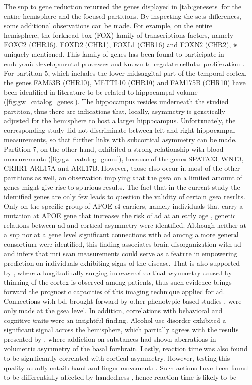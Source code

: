 The \ac{snp} to gene reduction returned the genes displayed in \autoref{tab:genesets} for the entire hemisphere and the focused partitions. By inspecting the sets differences, some additional observations can be made. For example, on the entire hemisphere, the forkhead box (FOX) family of transcriptions factors, namely   FOXC2 (CHR16), FOXD2 (CHR1), FOXL1 (CHR16) and FOXN2 (CHR2), is uniquely mentioned. This family of genes has been found to participate in embryonic developmental processes and known to regulate cellular proliferation \cite{Jackson2010}. For partition 5, which includes the lower midsaggital part of the temporal cortex, the genes FAM53B (CHR10), METTL10 (CHR10) and FAM175B (CHR10) have been identified in literature to be related to hippocampal volume \cite{VanderMeer2020} (\autoref{fig:gw_catalog_genes}). The hippocampus resides underneath the studied partition, thus there are indications that, locally, asymmetry is genetically adjusted for the hemisphere to host a larger hippocampus. Unfortunately, the corresponding study did not discriminate between left and right hippocampal measurements, so that further links with subcortical asymmetry can be made. Partition 7, on the other hand, exhibited a strong relationship with blood measurements (\autoref{fig:gw_catalog_genes}), because of the genes SPATA33, WNT3, CRHR1 ARL17A and ARL17B. However, those also occur in most of the other partitions as well, an observation implying that the \ac{gsea} on a limited amount of genes might give rise to spurious results. The fact that in the current study the identified genes are only few leads to question the validity of certain \ac{gsea} results. Only on the specific group of APOE $\epsilon$4-carriers, namely individuals that carry a mutation at APOE gene that increases the risk of \ac{ad} at an early age \cite{Michaelson2014},  genetic relations between \ac{ad} and cortical asymmetry were identified. Although neither at a \ac{snp} nor at a gene level significant connections with \ac{ad} among a more general consortium were identified, this finding associates brain disorganization with \ac{ad} and infers that \ac{mri} scan measurements  could serve as a feature in empowering prediction on individuals exhibiting signs of the disease. That is also supported by \citet{Roe2021}, where a longitudinally surging increase of cortical asymmetry caused by thinning of the cortex is observed among patients, thus such evidence brings forward the prognostic capacities of this imaging technique applied for \ac{ad}. Connections with \ac{bd}, brought forward by other phenotypic-based studies \cite{Wang2018}, were only made at the \ac{gsea} level. In addition, correlations with behavioral and cognitive traits were an insightful finding. Alcohol use disorder exhibited a significant signal across the hemisphere, which partially agrees with the results presented by \citet{Cao2021}, where addiction on substances had shown aberrations in volumetric asymmetry of the basal forebrain. Lastly, reaction time was also found to be significantly correlated with cortical asymmetry. However, testing this quality usually entails hand and finger movements \cite{Brenner2019}. Such actions have been found to be differentially affected by handedness \cite{Cheng2020}, hence reaction time is likely to be 